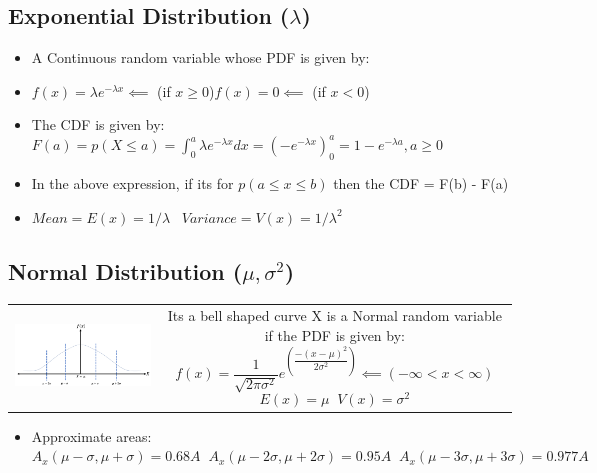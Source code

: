 \documentclass[8pt]{report}
\begin{document}
		\subsection{Exponential Distribution ($\lambda$)}
			\begin{itemize}
				\item A Continuous random variable whose PDF is given by:
				\item $\boxed{f(x) = \lambda e^{-\lambda x}}\impliedby$ (if $x\geq 0$)\hspace{0.5cm}$\boxed{f(x) = 0}\impliedby$ (if $x < 0$)
				\item The CDF is given by: $F(a) = p(X\le a) = \int_0^a\lambda e^{-\lambda x}dx = \left(-e^{-\lambda x}\right)_0^a = \boxed{1-e^{-\lambda a}}, a \geq 0$
				\item In the above expression, if its for $p(a \le x \le b)$ then the CDF = F(b) - F(a)
				\item $\boxed{Mean = E(x) = 1/\lambda}\;\;\;\boxed{Variance = V(x) = 1/\lambda^2}$
			\end{itemize}\hrulefill
		\subsection{Normal Distribution ($\mu,\sigma^2$)}
			\begin{table}[H]
				\centering
				\def\arraystretch{1.5}
				\begin{tabular}{cc}
					\parbox{4cm}{\vspace{1cm}\includegraphics[scale=0.4]{normaldistribution.png}} & \hspace{3cm}
					\parbox{12cm}{Its a bell shaped curve\\\\X is a Normal random variable if the PDF is given by:\\$$\boxed{f(x) = \dfrac{1}{\sqrt{2\pi\sigma^2}}e^{\left(\dfrac{-(x-\mu)^2}{2\sigma^2}\right)}}\impliedby (-\infty < x < \infty)$$\\$$\boxed{E(x) = \mu}\;\;\boxed{V(x) = \sigma^2}$$}
				\end{tabular}
			\end{table}
			\begin{itemize}
				\item Approximate areas: $\boxed{A_x(\mu-\sigma,\mu+\sigma) = 0.68A}\;\;\boxed{A_x(\mu-2\sigma,\mu+2\sigma)=0.95A}\;\;\boxed{A_x(\mu-3\sigma,\mu+3\sigma)=0.977A}$
			\end{itemize}\hrulefill
\end{document}
